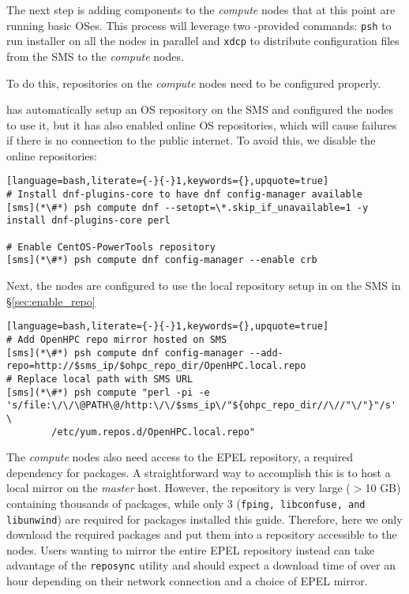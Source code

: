 
The next step is adding \OHPC{} components to the {\em compute} nodes that at this
point are running basic OSes.  This process will leverage two \xCAT{}-provided
commands: \texttt{psh} to run \texttt{\pkgmgr{}} installer on all the
nodes in parallel  and \texttt{xdcp} to distribute configuration files from the
SMS to the {\em compute} nodes.

\noindent To do this, repositories on the {\em compute} nodes need to be configured
properly.

\xCAT{} has automatically setup an  OS repository on the SMS and configured the
nodes to use it, but it has  also enabled online OS repositories, which will
cause  \texttt{\pkgmgr{}} failures if there is no connection to the public internet.
To avoid this, we disable the online repositories:

\begin{lstlisting}[language=bash,literate={-}{-}1,keywords={},upquote=true]
# Install dnf-plugins-core to have dnf config-manager available
[sms](*\#*) psh compute dnf --setopt=\*.skip_if_unavailable=1 -y install dnf-plugins-core perl

# Enable CentOS-PowerTools repository
[sms](*\#*) psh compute dnf config-manager --enable crb
\end{lstlisting}

\noindent Next, the nodes are configured to use the local \OHPC{} repository
setup in on the SMS in \S\ref{sec:enable_repo}

\begin{lstlisting}[language=bash,literate={-}{-}1,keywords={},upquote=true]
# Add OpenHPC repo mirror hosted on SMS
[sms](*\#*) psh compute dnf config-manager --add-repo=http://$sms_ip/$ohpc_repo_dir/OpenHPC.local.repo
# Replace local path with SMS URL
[sms](*\#*) psh compute "perl -pi -e 's/file:\/\/\@PATH\@/http:\/\/$sms_ip\/"${ohpc_repo_dir//\//"\/"}"/s' \
        /etc/yum.repos.d/OpenHPC.local.repo"
\end{lstlisting}

The {\em compute} nodes also need access to the EPEL repository, a required
dependency for \OHPC{} packages. A straightforward way to accomplish this is to
host a local mirror on the {\em master} host. However, the repository is very
large ($>$10 GB) containing thousands of packages, while only 3 (\texttt{fping,
libconfuse, and libunwind}) are required for packages installed this guide.  Therefore,
here we only download the required packages and put them into a repository
accessible to the nodes.  Users wanting to mirror the entire EPEL repository
instead can take advantage of the \texttt{reposync} utility and should expect a
download time of over an hour depending on their network connection and a choice
of EPEL mirror.

